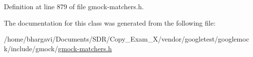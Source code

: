 Definition at line 879 of file gmock-\/matchers.\+h.



The documentation for this class was generated from the following file\+:\begin{DoxyCompactItemize}
\item 
/home/bhargavi/\+Documents/\+S\+D\+R/\+Copy\+\_\+\+Exam\+\_\+X/vendor/googletest/googlemock/include/gmock/\hyperlink{gmock-matchers_8h}{gmock-\/matchers.\+h}\end{DoxyCompactItemize}
